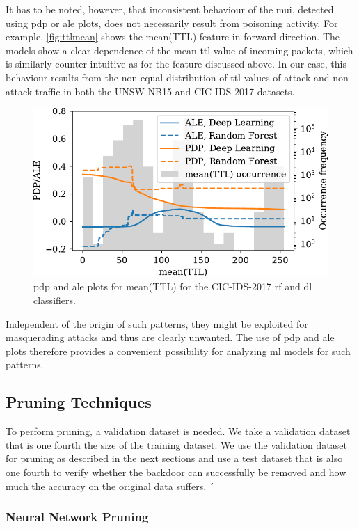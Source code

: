 \documentclass[10pt,sigconf,letterpaper,dvipsnames]{acmart}
\newcommand{\unsw}{UNSW-NB15}
\begin{document}
It has to be noted, however, that inconsistent behaviour of the \gls{mui}, detected using \gls{pdp} or \gls{ale} plots, does not necessarily result from poisoning activity.  For example, \autoref{fig:ttlmean} shows the mean(TTL) feature in forward direction. The models show a clear dependence of the mean \gls{ttl} value of incoming packets, which is similarly counter-intuitive as for the feature discussed above. In our case, this behaviour results from the non-equal distribution of \gls{ttl} values of attack and non-attack traffic in both the \unsw{} and CIC-IDS-2017 datasets.

\begin{figure}[b]
\includegraphics[width=\columnwidth]{figures/ttlmean.pdf}
\caption{\gls{pdp} and \gls{ale} plots for mean(TTL) for the CIC-IDS-2017 \gls{rf} and \gls{dl} classifiers.}
\label{fig:ttlmean}
\end{figure}
Independent of the origin of such patterns, they might be exploited for masquerading attacks and thus are clearly unwanted. The use of \gls{pdp} and \gls{ale} plots therefore provides a convenient possibility for analyzing \gls{ml} models for such patterns.
\subsection{Pruning Techniques}


To perform pruning, a validation dataset is needed. We take a validation dataset that is one fourth the size of the training dataset. We use the validation dataset for pruning as described in the next sections and use a test dataset that is also one fourth to verify whether the backdoor can successfully be removed and how much the accuracy on the original data suffers. ´

\subsubsection{Neural Network Pruning}
\end{document}

